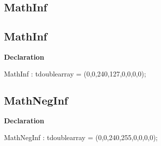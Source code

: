 \documentclass{report}
\newif\ifpdf
\begin{document}
\subsection*{\large{\textbf{MathInf}}\normalsize\hspace{1ex}\hrulefill}
\else
\subsection*{MathInf}
\fi
\label{ok_if_directive-MathInf}
\begin{list}{}{
\setlength{\itemindent}{0cm}
\setlength{\listparindent}{0cm}
\setlength{\leftmargin}{\evensidemargin}
\addtolength{\leftmargin}{\tmplength}
\settowidth{\labelsep}{X}
\addtolength{\leftmargin}{\labelsep}
\setlength{\labelwidth}{\tmplength}
}
\item[\textbf{Declaration}\hfill]
\ifpdf
\begin{flushleft}
\fi
\begin{ttfamily}
MathInf : tdoublearray = (0,0,240,127,0,0,0,0);\end{ttfamily}

\ifpdf
\end{flushleft}
\fi

\end{list}
\ifpdf
\subsection*{\large{\textbf{MathNegInf}}\normalsize\hspace{1ex}\hrulefill}
\else
\subsection*{MathNegInf}
\fi
\label{ok_if_directive-MathNegInf}
\begin{list}{}{
\setlength{\itemindent}{0cm}
\setlength{\listparindent}{0cm}
\setlength{\leftmargin}{\evensidemargin}
\addtolength{\leftmargin}{\tmplength}
\settowidth{\labelsep}{X}
\addtolength{\leftmargin}{\labelsep}
\setlength{\labelwidth}{\tmplength}
}
\item[\textbf{Declaration}\hfill]
\ifpdf
\begin{flushleft}
\fi
\begin{ttfamily}
MathNegInf : tdoublearray = (0,0,240,255,0,0,0,0);\end{ttfamily}

\ifpdf
\end{flushleft}
\fi

\end{list}
\ifpdf
\end{document}
